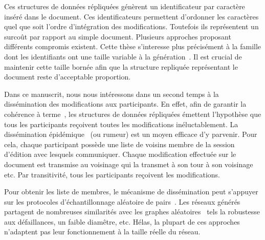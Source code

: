 Ces structures de données répliquées génèrent un identificateur par caractère
inséré dans le document. Ces identificateurs permettent d'ordonner les
caractères quel que soit l'ordre d'intégration des modifications. Toutefois ils
représentent un surcoût par rapport au simple document. Plusieurs approches
proposant différents compromis existent. Cette thèse s'interesse plus
précisément à la famille dont les identifiants ont une taille variable à la
génération~\cite{andre2013supporting, preguica2009commutative, weiss2009logoot}.
Il est crucial de maintenir cette taille bornée afin que la structure repliquée
représentant le document reste d'acceptable proportion.

Dans ce manuscrit, nous nous intéressons dans un second temps à la dissémination
des modifications aux participants. En effet, afin de garantir la cohérence à
terme~\cite{bailis2013eventual}, les structures de données répliquées émettent
l'hypothèse que tous les participants reçoivent toutes les modifications
inéluctablement. La dissémination épidémique~\cite{birman1999bimodal,
demers1987epidemic, eugster2003lightweight} (ou rumeur) est un moyen efficace
d'y parvenir. Pour cela, chaque participant possède une liste de voisins membre
de la session d'édition avec lesquels communiquer. Chaque modification effectuée
sur le document est transmise au voisinage qui la transmet à son tour à son
voisinage etc. Par transitivité, tous les participants reçoivent les
modifications.

Pour obtenir les liste de membres, le mécanisme de dissémination peut s'appuyer
sur les protocoles d'échantillonnage aléatoire de
pairs~\cite{eugster2003lightweight, ganesh2001scamp, jelasity2007gossip,
tolgyeski2009adaptive, voulgaris2005cyclon}. Les réseaux générés partagent de
nombreuses similarités avec les graphes aléatoires~\cite{erdos1959random} tels
la robustesse aux défaillances, un faible diamêtre, etc. Hélas, la plupart de
ces approches n'adaptent pas leur fonctionnement à la taille réelle du réseau.



